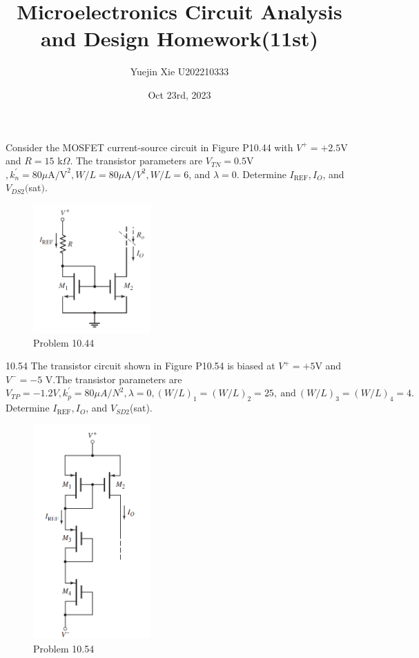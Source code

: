 \documentclass[a4paper,11pt,UTF8]{article}
\title{Microelectronics Circuit Analysis and Design Homework(11st)}
\author{Yuejin Xie \quad U202210333}
\date{Oct 23rd, 2023}
\begin{document}
 Consider the MOSFET current-source circuit in Figure P10.44 with $V^+=+ 2.5$V and $R= 15$ k$\Omega$. The transistor parameters are $V_{TN}= 0.5$V$, k_n^{\prime}= 80\mu\mathrm{A/V}^{2},W/L=80\mu$A$/V^2, W/L= 6$, and $\lambda=0$. Determine $I_{\mathrm{REF}},I_{O}$, and $V_{DS2}( $sat$) .$
\begin{figure}[H]
	\centering
	\includegraphics[width=0.4\textwidth]{10.44}
	\caption{Problem 10.44}
\end{figure}
10.54 The transistor circuit shown in Figure P10.54 is biased at $V^+=+5$V and $V^{-}=-5$ V.The transistor parameters are $V_{TP}=-1.2 V, k_p^{\prime}=80\mu A/N^2,\lambda=0,(W/L)_1=(W/L)_2=25,\mathrm{~and~}(W/L)_3=(W/L)_4=4.$ 
Determine $I_\mathrm{REF},I_O$, and $V_{SD2}$(sat).
\begin{figure}[H]
	\centering
	\includegraphics[width=0.4\textwidth]{10.54}
	\caption{Problem 10.54}
\end{figure}
\end{document}
